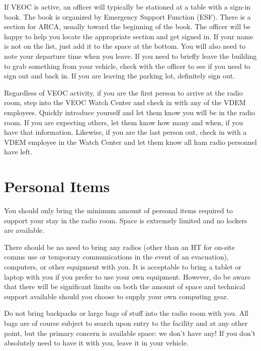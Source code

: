 \documentclass[pdflatex,letterpaper,twoside,12pt]{book}
\begin{document}
If VEOC is active, an officer will typically be stationed at a table with a sign-in book.  The book is organized by Emergency Support Function (ESF).  There is a section for ARCA, usually toward the beginning of the book.  The officer will be happy to help you locate the appropriate section and get signed in.  If your name is not on the list, just add it to the space at the bottom.  You will also need to note your departure time when you leave.  If you need to briefly leave the building to grab something from your vehicle, check with the officer to see if you need to sign out and back in.  If you are leaving the parking lot, definitely sign out.

Regardless of VEOC activity, if you are the first person to arrive at the radio room, step into the VEOC Watch Center and check in with any of the VDEM employees.  Quickly introduce yourself and let them know you will be in the radio room.  If you are expecting others, let them know how many and when, if you have that information.  Likewise, if you are the last person out, check in with a VDEM employee in the Watch Center and let them know all ham radio personnel have left.


\section{Personal Items}

You should only bring the minimum amount of personal items required to support your stay in the radio room.  Space is extremely limited and no lockers are available.

There should be no need to bring any radios (other than an HT for on-site comms use or temporary communications in the event of an evacuation), computers, or other equipment with you.  It is acceptable to bring a tablet or laptop with you if you prefer to use your own equipment.  However, do be aware that there will be significant limits on both the amount of space and technical support available should you choose to supply your own computing gear.

Do not bring backpacks or large bags of stuff into the radio room with you.  All bags are of course subject to search upon entry to the facility and at any other point, but the primary concern is available space: we don't have any!  If you don't absolutely need to have it with you, leave it in your vehicle.
\end{document}
